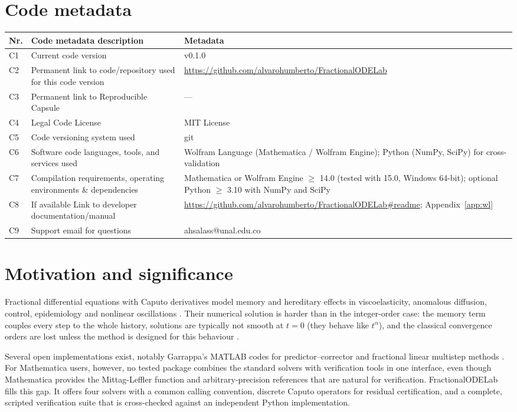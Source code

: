 \documentclass[11pt]{article}
\begin{document}
\section*{Code metadata}
\small
\begin{tabular}{@{}p{}p{}p{}@{}}\toprule
Nr. & Code metadata description & Metadata\\\midrule
C1 & Current code version & v0.1.0\\
C2 & Permanent link to code/repository used for this code version & \url{https://github.com/alvarohumberto/FractionalODELab}\\
C3 & Permanent link to Reproducible Capsule & ---\\
C4 & Legal Code License & MIT License\\
C5 & Code versioning system used & git\\
C6 & Software code languages, tools, and services used & Wolfram Language (Mathematica / Wolfram Engine); Python (NumPy, SciPy) for cross-validation\\
C7 & Compilation requirements, operating environments \& dependencies & Mathematica or Wolfram Engine $\geq$ 14.0 (tested with 15.0, Windows 64-bit); optional Python $\geq$ 3.10 with NumPy and SciPy\\
C8 & If available Link to developer documentation/manual & \url{https://github.com/alvarohumberto/FractionalODELab\#readme}; Appendix~\ref{app:wl}\\
C9 & Support email for questions & ahsalass@unal.edu.co\\\bottomrule
\end{tabular}
\normalsize

\section{Motivation and significance}
Fractional differential equations with Caputo derivatives model memory and hereditary effects in viscoelasticity, anomalous diffusion, control, epidemiology and nonlinear oscillations \cite{podlubny,diethelmbook,kilbas}. Their numerical solution is harder than in the integer-order case: the memory term couples every step to the whole history, solutions are typically not smooth at $t=0$ (they behave like $t^{\alpha}$), and the classical convergence orders are lost unless the method is designed for this behaviour \cite{dff2002,dff2004,garrappa2015,garrappa2018}.

Several open implementations exist, notably Garrappa's MATLAB codes for predictor--corrector and fractional linear multistep methods \cite{garrappa2015,garrappa2018}. For Mathematica users, however, no tested package combines the standard solvers with verification tools in one interface, even though Mathematica provides the Mittag-Leffler function and arbitrary-precision references that are natural for verification. FractionalODELab fills this gap. It offers four solvers with a common calling convention, discrete Caputo operators for residual certification, and a complete, scripted verification suite that is cross-checked against an independent Python implementation.
\end{document}

